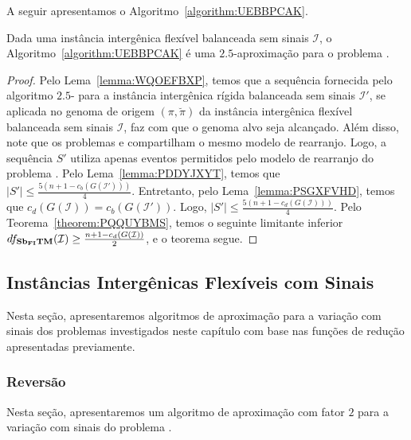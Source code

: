 A seguir apresentamos o Algoritmo~\ref{algorithm:UEBBPCAK}.



\begin{theorem}\label{theorem:DWYTBIPX}
Dada uma instância intergênica flexível balanceada sem sinais $\mathcal{I}$, o Algoritmo~\ref{algorithm:UEBBPCAK} é uma $2.5$-aproximação para o problema \SbFIT{}.
\end{theorem}
\begin{proof}
Pelo Lema~\ref{lemma:WQOEFBXP}, temos que a sequência fornecida pelo algoritmo $2.5$-\SbIT{} para a instância intergênica rígida balanceada sem sinais $\mathcal{I'}$, se aplicada no genoma de origem $(\pi,\breve\pi)$ da instância intergênica flexível balanceada sem sinais $\mathcal{I}$, faz com que o genoma alvo seja alcançado. Além disso, note que os problemas \SbITM{} e \SbFITM{} compartilham o mesmo modelo de rearranjo. Logo, a sequência $S'$ utiliza apenas eventos permitidos pelo modelo de rearranjo do problema \SbFITM{}. Pelo Lema~\ref{lemma:PDDYJXYT}, temos que $|S'| \le \frac{5({n+1} - c_b(G(\mathcal{I}')))}{4}$. Entretanto, pelo Lema~\ref{lemma:PSGXFVHD}, temos que $c_d(G(\mathcal{I})) = c_b(G(\mathcal{I}'))$. Logo, $|S'| \le \frac{5({n+1} - c_d(G(\mathcal{I})))}{4}$. Pelo Teorema~\ref{theorem:PQQUYBMS}, temos o seguinte limitante inferior $df_{\textbf{Sb\textsubscript{FI}TM}}(\mathcal{I}) \ge \frac{{n+1} - c_d(G(\mathcal{I}))}{2}$, e o teorema segue.
\end{proof}

\subsection{Instâncias Intergênicas Flexíveis com Sinais}

Nesta seção, apresentaremos algoritmos de aproximação para a variação com sinais dos problemas investigados neste capítulo com base nas funções de redução apresentadas previamente.

\subsubsection{Reversão}

Nesta seção, apresentaremos um algoritmo de aproximação com fator $2$ para a variação com sinais do problema \SbFIR{}. 

